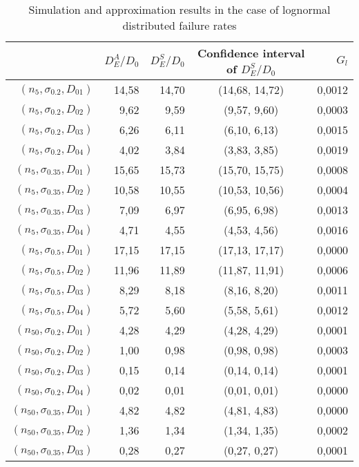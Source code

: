 \documentclass[preprint,12pt]{elsarticle}
\begin{document}
\begin{table}[htbp]
  \small
  \centering
  \caption{Simulation and approximation results in the case of lognormal distributed failure rates}
    \begin{tabular}{rrrcr}
    \toprule
          & $D_{E}^{A}/D_0$ & $D_{E}^{S}/D_0$ & Confidence interval of $D_{E}^{S}/D_0$ &  $G_{l}$ \\
    \midrule
    $(n_{5},\sigma_{0.2},D_{01})$ & 14,58 & 14,70 & (14,68, 14,72) & 0,0012 \\
    $(n_{5},\sigma_{0.2},D_{02})$ & 9,62  & 9,59  & (9,57, 9,60) & 0,0003 \\
    $(n_{5},\sigma_{0.2},D_{03})$ & 6,26  & 6,11  & (6,10, 6,13) & 0,0015 \\
    $(n_{5},\sigma_{0.2},D_{04})$ & 4,02  & 3,84  & (3,83, 3,85) & 0,0019 \\
    $(n_{5},\sigma_{0.35},D_{01})$ & 15,65 & 15,73 & (15,70, 15,75) & 0,0008 \\
    $(n_{5},\sigma_{0.35},D_{02})$ & 10,58 & 10,55 & (10,53, 10,56) & 0,0004 \\
    $(n_{5},\sigma_{0.35},D_{03})$& 7,09  & 6,97  & (6,95, 6,98) & 0,0013 \\
    $(n_{5},\sigma_{0.35},D_{04})$ & 4,71  & 4,55  & (4,53, 4,56) & 0,0016 \\
    $(n_{5},\sigma_{0.5},D_{01})$ & 17,15 & 17,15 & (17,13, 17,17) & 0,0000 \\
    $(n_{5},\sigma_{0.5},D_{02})$ & 11,96 & 11,89 & (11,87, 11,91) & 0,0006 \\
    $(n_{5},\sigma_{0.5},D_{03})$ & 8,29  & 8,18  & (8,16, 8,20) & 0,0011 \\
    $(n_{5},\sigma_{0.5},D_{04})$ & 5,72  & 5,60  & (5,58, 5,61) & 0,0012 \\
    $(n_{50},\sigma_{0.2},D_{01})$ & 4,28  & 4,29  & (4,28, 4,29) & 0,0001 \\
    $(n_{50},\sigma_{0.2},D_{02})$ & 1,00  & 0,98  & (0,98, 0,98) & 0,0003 \\
    $(n_{50},\sigma_{0.2},D_{03})$ & 0,15  & 0,14  & (0,14, 0,14) & 0,0001 \\
    $(n_{50},\sigma_{0.2},D_{04})$ & 0,02  & 0,01  & (0,01, 0,01) & 0,0000 \\
    $(n_{50},\sigma_{0.35},D_{01})$ & 4,82  & 4,82  & (4,81, 4,83) & 0,0000 \\
    $(n_{50},\sigma_{0.35},D_{02})$ & 1,36  & 1,34  & (1,34, 1,35) & 0,0002 \\
    $(n_{50},\sigma_{0.35},D_{03})$& 0,28  & 0,27  & (0,27, 0,27) & 0,0001 \\

\end{tabular}
\end{table}
\end{document}
